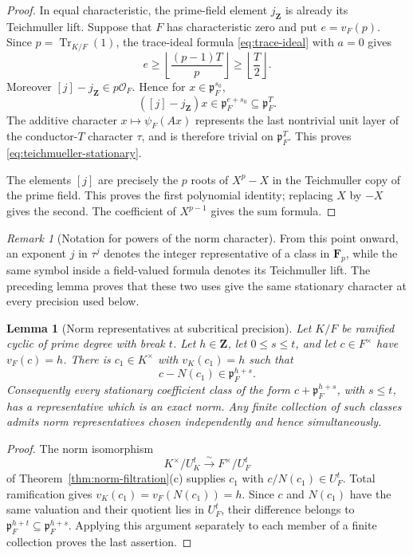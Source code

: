 \documentclass[11pt]{amsart}
\newtheorem{lemma}[theorem]{Lemma}
\theoremstyle{definition}
\theoremstyle{remark}
\newtheorem{remark}[theorem]{Remark}
\newcommand{\F}{\mathbf F}
\newcommand{\cO}{\mathcal O}
\newcommand{\p}{\mathfrak p}
\newcommand{\Tr}{\operatorname{Tr}}
\begin{document}
\begin{proof}
In equal characteristic, the prime-field element $j_{\mathbf Z}$ is
already its Teichmuller lift.  Suppose that $F$ has characteristic zero
and put $e=v_F(p)$.  Since $p=\Tr_{K/F}(1)$, the trace-ideal formula
\eqref{eq:trace-ideal} with $a=0$ gives
\[
 e\ge \left\lfloor\frac{(p-1)T}{p}\right\rfloor
   \ge \left\lfloor\frac T2\right\rfloor.
\]
Moreover $[j]-j_{\mathbf Z}\in p\cO_F$.  Hence for
$x\in\p_F^{s_0}$,
\[
 ([j]-j_{\mathbf Z})x\in
 \p_F^{e+s_0}\subseteq\p_F^T.
\]
The additive character $x\mapsto\psi_F(Ax)$ represents the last
nontrivial unit layer of the conductor-$T$ character $\tau$, and is
therefore trivial on $\p_F^T$.  This proves
\eqref{eq:teichmueller-stationary}.

The elements $[j]$ are precisely the $p$ roots of $X^p-X$ in the
Teichmuller copy of the prime field.  This proves the first polynomial
identity; replacing $X$ by $-X$ gives the second.  The coefficient of
$X^{p-1}$ gives the sum formula.
\end{proof}

\begin{remark}[Notation for powers of the norm character]
From this point onward, an exponent $j$ in $\tau^j$ denotes the integer
representative of a class in $\F_p$, while the same symbol inside a
field-valued formula denotes its Teichmuller lift.  The preceding lemma
proves that these two uses give the same stationary character at every
precision used below.
\end{remark}

\begin{lemma}[Norm representatives at subcritical precision]
\label{lem:norm-stationary-representatives}
Let $K/F$ be ramified cyclic of prime degree with break $t$.  Let
$h\in\mathbf Z$, let $0\le s\le t$, and let $c\in F^\times$ have
$v_F(c)=h$.  There is $c_1\in K^\times$ with $v_K(c_1)=h$ such that
\begin{equation}\label{eq:norm-representative-precision}
 c-N(c_1)\in\p_F^{h+s}.
\end{equation}
Consequently every stationary coefficient class of the form
$c+\p_F^{h+s}$, with $s\le t$, has a representative which is an exact
norm.  Any finite collection of such classes admits norm
representatives chosen independently and hence simultaneously.
\end{lemma}

\begin{proof}
The norm isomorphism
\[
 K^\times/U_K^t\xrightarrow{\sim}F^\times/U_F^t
\]
of Theorem~\ref{thm:norm-filtration}(c) supplies $c_1$ with
$c/N(c_1)\in U_F^t$.  Total ramification gives
$v_K(c_1)=v_F(N(c_1))=h$.  Since $c$ and $N(c_1)$ have the same
valuation and their quotient lies in $U_F^t$, their difference belongs
to $\p_F^{h+t}\subseteq\p_F^{h+s}$.  Applying this argument separately
to each member of a finite collection proves the last assertion.
\end{proof}
\end{document}
